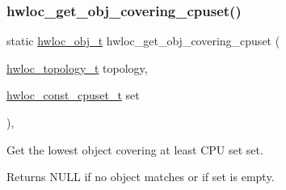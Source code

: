 \subsubsection{\texorpdfstring{hwloc\+\_\+get\+\_\+obj\+\_\+covering\+\_\+cpuset()}{hwloc\_get\_obj\_covering\_cpuset()}}
{\footnotesize\ttfamily static \hyperlink{a00185_ga79b8ab56877ef99ac59b833203391c7d}{hwloc\+\_\+obj\+\_\+t} hwloc\+\_\+get\+\_\+obj\+\_\+covering\+\_\+cpuset (\begin{DoxyParamCaption}\item[{\hyperlink{a00186_ga9d1e76ee15a7dee158b786c30b6a6e38}{hwloc\+\_\+topology\+\_\+t}}]{topology,  }\item[{\hyperlink{a00183_ga1f784433e9b606261f62d1134f6a3b25}{hwloc\+\_\+const\+\_\+cpuset\+\_\+t}}]{set }\end{DoxyParamCaption})\hspace{0.3cm}{\ttfamily [inline]}, {\ttfamily [static]}}



Get the lowest object covering at least C\+PU set {\ttfamily set}. 

\begin{DoxyReturn}{Returns}
{\ttfamily N\+U\+LL} if no object matches or if {\ttfamily set} is empty. 
\end{DoxyReturn}
